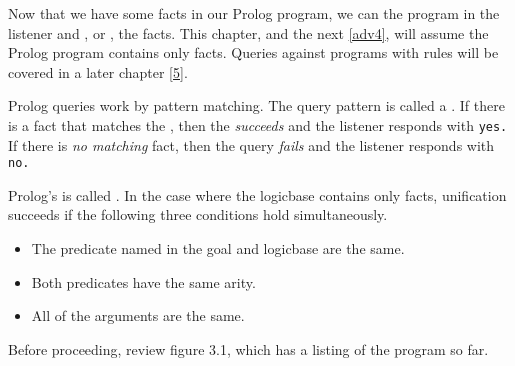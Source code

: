 \label{adv3}\secdown

Now that we have some facts in our Prolog program, we can
 the program in the listener and
, or , the facts. This
chapter, and the next \ref{adv4}, will assume the Prolog program contains only
facts. Queries against programs with rules will be covered in a later chapter
\ref{5}.

Prolog queries work by pattern matching. The query pattern is called a
. If there is a fact that matches the ,
then the  \emph{succeeds} and the listener responds with
\verb'yes.' If there is \emph{no matching} fact, then the
query \emph{fails} and the listener responds with \verb'no.'

Prolog's  is called
. In the case where the logicbase
contains only facts, unification succeeds if the following three conditions hold
simultaneously.
\begin{itemize}[nosep]
  \item 
The predicate named in the goal and logicbase are the same.
  \item 
Both predicates have the same arity.
  \item 
All of the arguments are the same.
\end{itemize}

Before proceeding, review figure 3.1, which has a listing of the program so far.


\secup